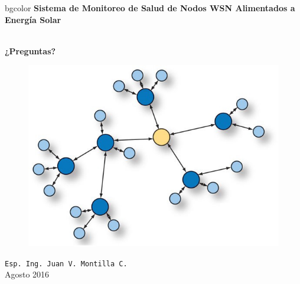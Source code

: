 \documentclass[aspectratio=43, handout]{beamer}
\begin{document}
\begingroup
\makeatletter
\setlength{\hoffset}{-.5\beamer@sidebarwidth}
\makeatother
\begin{frame}
\begin{center}
\hfill
    \begin{beamercolorbox}[center,dp=3ex,ht=10.25ex, wd=1\linewidth]{bgcolor}
        \Large\textbf{Sistema de Monitoreo de Salud de Nodos WSN Alimentados a Energía Solar}\\
    \end{beamercolorbox}
\hfill\hfill
\\
\vspace{5px}
\vspace{10px}
\textbf{\LARGE{¿Preguntas?}}\\

\vspace{10px}

\begin{figure}[H]
	\includegraphics[width=.3\textwidth]{./imagenes/red.jpg}
\end{figure}	
\vspace{10px}
\texttt{Esp. Ing. Juan V. Montilla C.}\\

\vspace{5px}
\tiny Agosto 2016 
 	  	
\end{center}
\end{frame}
\end{document}
